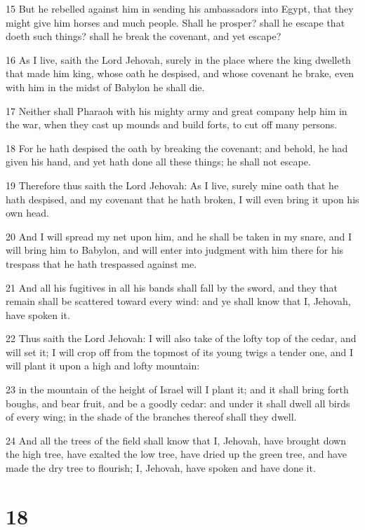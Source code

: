 \par 15 But he rebelled against him in sending his ambassadors into Egypt, that they might give him horses and much people. Shall he prosper? shall he escape that doeth such things? shall he break the covenant, and yet escape?
\par 16 As I live, saith the Lord Jehovah, surely in the place where the king dwelleth that made him king, whose oath he despised, and whose covenant he brake, even with him in the midst of Babylon he shall die.
\par 17 Neither shall Pharaoh with his mighty army and great company help him in the war, when they cast up mounds and build forts, to cut off many persons.
\par 18 For he hath despised the oath by breaking the covenant; and behold, he had given his hand, and yet hath done all these things; he shall not escape.
\par 19 Therefore thus saith the Lord Jehovah: As I live, surely mine oath that he hath despised, and my covenant that he hath broken, I will even bring it upon his own head.
\par 20 And I will spread my net upon him, and he shall be taken in my snare, and I will bring him to Babylon, and will enter into judgment with him there for his trespass that he hath trespassed against me.
\par 21 And all his fugitives in all his bands shall fall by the sword, and they that remain shall be scattered toward every wind: and ye shall know that I, Jehovah, have spoken it.
\par 22 Thus saith the Lord Jehovah: I will also take of the lofty top of the cedar, and will set it; I will crop off from the topmost of its young twigs a tender one, and I will plant it upon a high and lofty mountain:
\par 23 in the mountain of the height of Israel will I plant it; and it shall bring forth boughs, and bear fruit, and be a goodly cedar: and under it shall dwell all birds of every wing; in the shade of the branches thereof shall they dwell.
\par 24 And all the trees of the field shall know that I, Jehovah, have brought down the high tree, have exalted the low tree, have dried up the green tree, and have made the dry tree to flourish; I, Jehovah, have spoken and have done it.

\chapter{18}

